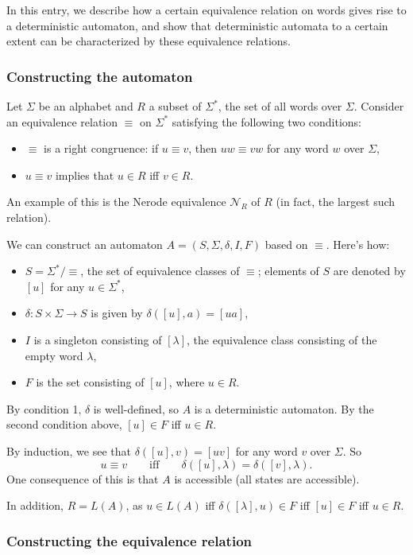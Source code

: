 \documentclass[12pt]{article}
\begin{document}
In this entry, we describe how a certain equivalence relation on words gives rise to a deterministic automaton, and show that deterministic automata to a certain extent can be characterized by these equivalence relations.

\subsubsection*{Constructing the automaton}

Let $\Sigma$ be an alphabet and $R$ a subset of $\Sigma^*$, the set of all words over $\Sigma$.  Consider an equivalence relation $\equiv$ on $\Sigma^*$ satisfying the following two conditions:
\begin{itemize}
\item $\equiv$ is a right congruence: if $u\equiv v$, then $uw\equiv vw$ for any word $w$ over $\Sigma$,
\item $u \equiv v$ implies that $u\in R$ iff $v\in R$.
\end{itemize}
An example of this is the Nerode equivalence $\mathcal{N}_R$ of $R$ (in fact, the largest such relation).

We can construct an automaton $A=(S,\Sigma,\delta,I,F)$ based on $\equiv$.  Here's how:
\begin{itemize}
\item $S=\Sigma^*/\equiv$, the set of equivalence classes of $\equiv$; elements of $S$ are denoted by $[u]$ for any $u\in \Sigma^*$,
\item $\delta:S\times \Sigma \to S$ is given by $\delta([u],a)=[ua]$,
\item $I$ is a singleton consisting of $[\lambda]$, the equivalence class consisting of the empty word $\lambda$,
\item $F$ is the set consisting of $[u]$, where $u\in R$.
\end{itemize}
By condition 1, $\delta$ is well-defined, so $A$ is a deterministic automaton.  By the second condition above, $[u]\in F$ iff $u\in R$.

By induction, we see that $\delta([u],v)=[uv]$ for any word $v$ over $\Sigma$.  So $$u\equiv v \qquad \mbox{iff} \qquad \delta([u],\lambda)=\delta([v],\lambda).$$  One consequence of this is that $A$ is accessible (all states are accessible).

In addition, $R=L(A)$, as $u\in L(A)$ iff $\delta([\lambda],u)\in F$ iff $[u]\in F$ iff $u\in R$.

\subsubsection*{Constructing the equivalence relation}
\end{document}
